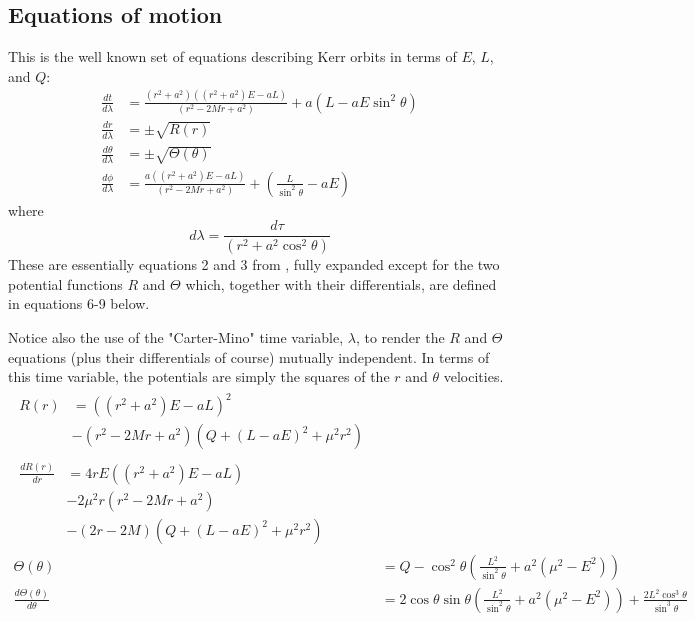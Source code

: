 \documentclass[11pt]{article}
\begin{document}
\subsection {Equations of motion}

This is the well known set of equations describing Kerr orbits in terms of $E$, $L$, and $Q$:
\begin{align}
\frac{d t}{d \lambda} &= \frac{(r^2 + a^2) \left((r^2 + a^2) E - aL \right)} {(r^2 - 2Mr  + a^2)} + a(L - aE \sin^2 \theta) \\
\frac{d r}{d \lambda} &= \pm \sqrt {R(r)} \\
\frac{d \theta}{d \lambda} &= \pm \sqrt {\Theta (\theta)} \\
\frac{d \phi}{d \lambda} &= \frac{a \left((r^2 + a^2) E - aL \right)} {(r^2 - 2Mr  + a^2)} + \left(\frac {L} {\sin^2 \theta} -aE \right)
\end{align}
where
\begin{equation}
d \lambda = \frac {d \tau} {(r^2 + a^2 \cos^2\theta)}
\end{equation}
These are essentially equations 2 and 3 from \cite{wilkins}, fully expanded except for the two potential functions $R$ and $\Theta$ which, together with their differentials, are defined in equations 6-9 below.

Notice also the use of the "Carter-Mino" time variable, $\lambda$, to render the $R$ and $\Theta$ equations (plus their differentials of course) mutually independent.  In terms of this time variable, the potentials are simply the squares of the $r$ and $\theta$ velocities.
\begin{align}
   \begin{split}
    R(r) &= \left((r^2 + a^2) E - aL \right)^2 \label{eq:1}\\
    &- (r^2 - 2Mr  + a^2) \left(Q + ( L - aE)^2 + \mu^2 r^2 \right)
   \end{split}\\
   \begin{split}
    \frac{d R(r)}{d r} &= 4rE \left((r^2 + a^2)E - aL \right) \label{eq:2}\\
    &- 2\mu^2r(r^2 - 2Mr  + a^2)\\
    &- (2r - 2M) \left(Q + ( L - aE)^2 + \mu^2 r^2 \right)
   \end{split}\\
  \Theta (\theta) &= Q - {\cos^2 \theta } \left( \frac{L^2}{\sin^2 \theta } + a^2( \mu^2 - E^2) \right) \label{eq:3}\\
  \frac{d \Theta (\theta)}{d \theta} &= 2 \cos \theta \sin \theta \left(\frac{L^2} {\sin^2 \theta } + a^2(\mu^2 - E^2) \right) +\frac{2 L^2 \cos^3 \theta } {\sin^3 \theta } \label{eq:4}
\end{align}
\end{document}
